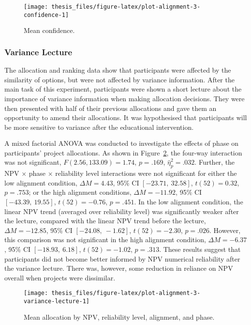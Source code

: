 \documentclass[a4paper, nobind]{templates/ociamthesis}
\theoremstyle{definition}
\theoremstyle{definition}
\theoremstyle{definition}
\theoremstyle{definition}
\theoremstyle{remark}
\begin{document}
\begin{figure}
\texttt{[image: thesis\_files/figure-latex/plot-alignment-3-confidence-1]} \caption{Mean confidence.}\label{fig:plot-alignment-3-confidence}
\end{figure}

\subsubsection{Variance Lecture}

The allocation and ranking data show that participants were affected by the
similarity of options, but were not affected by variance information. After the
main task of this experiment, participants were shown a short lecture about the
importance of variance information when making allocation decisions. They were
then presented with half of their previous allocations and gave them an
opportunity to amend their allocations. It was hypothesised that participants
will be more sensitive to variance after the educational intervention.

A mixed factorial ANOVA was conducted to investigate the effects of phase on
participants' project allocations. As shown in
Figure~\ref{fig:plot-alignment-3-variance-lecture}, the four-way interaction
was not significant,
\(F(2.56, 133.09) = 1.74\), \(p = .169\), \(\hat{\eta}^2_p = .032\).
Further, the NPV \(\times\) phase \(\times\) reliability level interactions were not
significant for either the low alignment condition,
\(\Delta M = 4.43\), 95\% CI \([-23.71,~32.58]\), \(t(52) = 0.32\), \(p = .753\); or the
high alignment conditions,
\(\Delta M = -11.92\), 95\% CI \([-43.39,~19.55]\), \(t(52) = -0.76\), \(p = .451\). In the
low alignment condition, the linear NPV trend (averaged over reliability level)
was significantly weaker after the lecture, compared with the linear NPV trend
before the lecture, \(\Delta M = -12.85\), 95\% CI \([-24.08,~-1.62]\), \(t(52) = -2.30\), \(p = .026\).
However, this comparison was not significant in the high alignment condition,
\(\Delta M = -6.37\), 95\% CI \([-18.93,~6.18]\), \(t(52) = -1.02\), \(p = .313\). These results
suggest that participants did not become better informed by NPV numerical
reliability after the variance lecture. There was, however, some reduction in
reliance on NPV overall when projects were dissimilar.



\begin{figure}[!htbp]
\texttt{[image: thesis\_files/figure-latex/plot-alignment-3-variance-lecture-1]} \caption{Mean allocation by NPV, reliability level, alignment, and phase.}\label{fig:plot-alignment-3-variance-lecture}
\end{figure}
\end{document}
